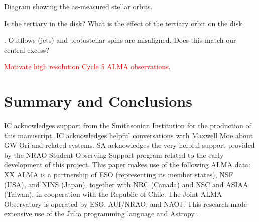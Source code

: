 \documentclass[twocolumn]{aastex61}
\newcommand{\todo}[1]{ \textcolor{red}{#1}}
\begin{document}
Diagram showing the as-measured stellar orbits.

Is the tertiary in the disk? What is the effect of the tertiary orbit on the disk.

\citep{offner16}. Outflows (jets) and protostellar spins are misaligned. Does this match our central excess?

\todo{Motivate high resolution Cycle 5 ALMA observations}.

\section{Summary and Conclusions} \label{sec:summary}

\acknowledgments
IC acknowledges support from the Smithsonian Institution for the production of this manuscript. IC acknowledges helpful conversations with Maxwell Moe about GW Ori and related systems.  SA acknowledges the very helpful support provided by the NRAO Student Observing Support program related to the early development of this project.  This paper makes use of the following ALMA data: XX  ALMA is a partnership of ESO (representing its member states), NSF (USA), and NINS (Japan), together with NRC (Canada) and NSC and ASIAA (Taiwan), in cooperation with the Republic of Chile.  The Joint ALMA Observatory is operated by ESO, AUI/NRAO, and NAOJ.  This research made extensive use of the Julia programming language \citep{julia12} and Astropy \citep{astropy13}.



\end{document}
